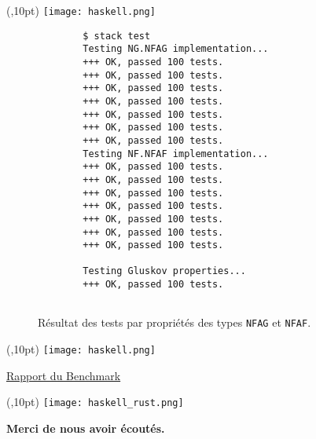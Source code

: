 \documentclass[aspectratio=169,xcolor=dvipsnames]{beamer}
\begin{document}

\begin{frame}[fragile]
    \begin{textblock*}{20pt}(\textwidth-50pt,10pt)
        \texttt{[image: haskell.png]}
    \end{textblock*}
    \begin{figure}
        \begin{verbatim}
        $ stack test
        Testing NG.NFAG implementation...
        +++ OK, passed 100 tests.
        +++ OK, passed 100 tests.
        +++ OK, passed 100 tests.
        +++ OK, passed 100 tests.
        +++ OK, passed 100 tests.
        +++ OK, passed 100 tests.
        +++ OK, passed 100 tests.
        Testing NF.NFAF implementation...
        +++ OK, passed 100 tests.
        +++ OK, passed 100 tests.
        +++ OK, passed 100 tests.
        +++ OK, passed 100 tests.
        +++ OK, passed 100 tests.
        +++ OK, passed 100 tests.
        +++ OK, passed 100 tests.
        
        Testing Gluskov properties...
        +++ OK, passed 100 tests.
        
      \end{verbatim}
        \caption{
            Résultat des tests par propriétés des types 
            \texttt{NFAG} et \texttt{NFAF}.
        }
    \end{figure}
\end{frame}


\begin{frame}[fragile]
    \begin{textblock*}{20pt}(\textwidth-50pt,10pt)
        \texttt{[image: haskell.png]}
    \end{textblock*}
    \begin{center}
        \href{run:./report_perf.html}{Rapport du Benchmark}
    \end{center}
\end{frame}


\begin{frame}
    \begin{textblock*}{20pt}(\textwidth-130pt,10pt)
        \texttt{[image: haskell\_rust.png]}
    \end{textblock*}
\end{frame}


\begin{frame}
    \Huge{\centerline{\textbf{Merci de nous avoir écoutés.}}}
\end{frame}

\end{document}
